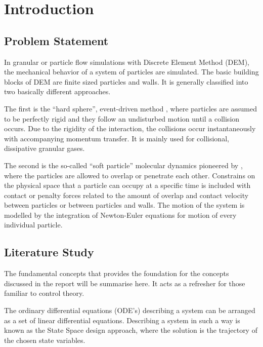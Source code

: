 \chapter{Introduction}
\label{chp:intro}


\section{Problem Statement}

In granular or particle flow simulations with Discrete Element Method (DEM),
the mechanical behavior of a system of particles are simulated. The basic
building blocks of DEM are finite sized particles and walls. It is generally
classified into two basically different approaches.

The first is the ``hard sphere'', event-driven method
\citep[e.g.][]{Luding-1994, Luding-2004}, where particles are assumed to be
perfectly rigid and they follow an undisturbed motion until a collision
occurs. Due to the rigidity of the interaction, the collisions occur
instantaneously with accompanying momentum transfer. It is mainly used for
collisional, dissipative granular gases.

The second is the so-called ``soft particle'' molecular dynamics pioneered by
\citet{Cundall-1979}, where the particles are allowed to overlap or penetrate
each other. Constrains on the physical space that a particle can occupy at a
specific time is included with contact or penalty forces related to the
amount of overlap and contact velocity between particles or between particles
and walls. The motion of the system is modelled by the integration of
Newton-Euler equations for motion of every individual particle.

\section{Literature Study}
The fundamental concepts that provides the foundation for the concepts discussed in the report will be summarise here. It acts as a refresher for those familiar to control theory. 

The ordinary differential equations (ODE's) describing a system can be arranged as a set of linear differential equations. Describing a system in such a way is known as the State Space design approach, where the solution is the trajectory of the chosen state variables.\cite{textbook}

